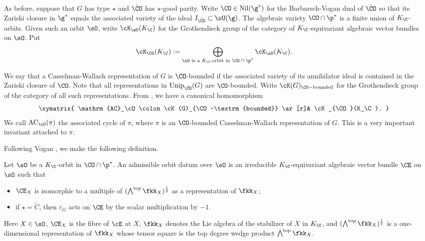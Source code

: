\documentclass[ssunip.tex]{subfiles}
\begin{document}
As before, suppose that $G$ has type $\star$ and $\check \CO$ has $\star$-good parity. Write $\CO\in \mathrm{Nil}(\g^*)$ for the Barbarsch-Vogan dual of $\check \CO$ so that its Zariski closure in $\g^*$ equals the associated variety of the ideal $I_{\check \CO}\subset \oU(\g)$.
The algebraic variety
$
  \CO\cap \p^*
$
is a finite union of $K_\C$-orbits.  Given such an orbit $\sO$, write
$\cK_{\sO}(K_\C)$ for the  Grothendieck group of the category of $K_\C$-equivariant algebraic vector bundles on $\sO$. Put
\[
\cK_{\CO}(K_\C):=\bigoplus_{\sO\textrm{ is a $K_\C$-orbit in
      $\CO\cap \p^*$}} \cK_{\sO}(K_\C).
\]



We say that a Casselman-Wallach representation of $G$ is  $\CO$-bounded  if
the associated variety  of its annihilator ideal
is contained in the Zariski closure of $\CO$. Note that all representations in $\mathrm{Unip}_{\check \CO}(G)$ are $\CO$-bounded. Write $\cK(G)_{\CO-\textrm{bounded}}$ for the  Grothendieck group of the category of all such representations.
From \cite[Theorem 2.13]{Vo89},  we have a canonical homomorphism
\[
\xymatrix{
  \mathrm{AC}_\cO\colon   \cK(G)_{\CO-\textrm{bounded}} \ar[r]& \cK_{\CO}(K_\C).
}
\]
We call $ \mathrm{AC}_\cO(\pi)$ the associated cycle of $\pi$, where $\pi$ is an $\CO$-bounded Casselman-Wallach representation of $G$. This is a very important invariant attached to $\pi$.


Following Vogan \cite[Section 8]{Vo89}, we make the following definition.

\begin{defn}\label{defaod}
  Let $\sO$ be a $K_\C$-orbit in $\CO\cap \p^*$. An admissible orbit datum over
  $\sO$ is an irreducible $K_\C$-equivariant algebraic vector bundle $\CE$
  on $\sO$ such that
  \begin{itemize}
    \item $\CE_X$ is isomorphic to a multiple of
    $(\bigwedge^{\mathrm{top}} \fkk_X )^{\frac{1}{2}}$ as a representation of
    $\fkk_X$;
    \item if $\star=\widetilde C$, then $\varepsilon_G$ acts on $\CE$ by the scalar multiplication by $-1$.
  \end{itemize}
  Here $X\in \sO$, $\CE_X$ is the fibre of $\cE$ at $X$, $\fkk_X$
  denotes the Lie algebra of the stabilizer of $X$ in $K_\C$, and
  $(\bigwedge^{\mathrm{top}} \fkk_X)^{\frac{1}{2}}$ is a one-dimensional
  representation of $\fkk_X$ whose tensor square is the top degree wedge
  product $\bigwedge^{\mathrm{top}} \fkk_X$.
\end{defn}
\end{document}
